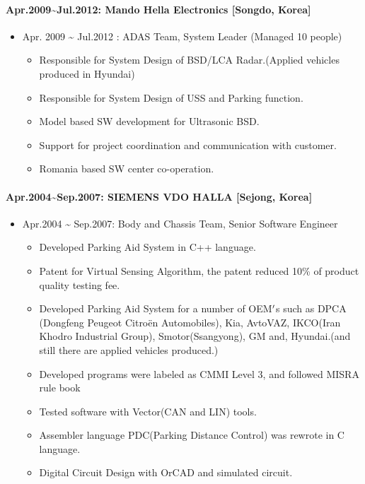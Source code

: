\documentclass[12pt,a4paper]{article}
\begin{document}
\paragraph{Apr.2009{\textasciitilde}Jul.2012: Mando Hella Electronics [Songdo, Korea]}
\begin{itemize}
\item Apr. 2009 {\textasciitilde} Jul.2012 : ADAS Team, System Leader (Managed 10 people)

\begin{itemize}
\item Responsible for System Design of BSD/LCA Radar.(Applied vehicles produced in Hyundai)


\item Responsible for System Design of USS and Parking function.


\item Model based SW development for Ultrasonic BSD.


\item Support for project coordination and communication with customer.


\item Romania based SW center co-operation.

\end{itemize}
\end{itemize}
\paragraph{Apr.2004{\textasciitilde}Sep.2007: SIEMENS VDO HALLA [Sejong, Korea]}
\begin{itemize}
\item Apr.2004 {\textasciitilde} Sep.2007: Body and Chassis Team, Senior Software Engineer

\begin{itemize}
\item Developed Parking Aid System in C++ language.


\item Patent for Virtual Sensing Algorithm, the patent reduced 10\% of product quality testing fee.


\item Developed Parking Aid System for a number of OEM\ensuremath{\rq}s such as DPCA (Dongfeng Peugeot Citroën Automobiles), Kia, AvtoVAZ, IKCO(Iran Khodro Industrial Group), Smotor(Ssangyong), GM and, Hyundai.(and still there are applied vehicles produced.)


\item Developed programs were labeled as CMMI Level 3, and followed MISRA rule book


\item Tested software with Vector(CAN and LIN) tools.


\item Assembler language PDC(Parking Distance Control) was rewrote in C language.


\item Digital Circuit Design with OrCAD and simulated circuit.

\end{itemize}
\end{itemize}
\end{document}
